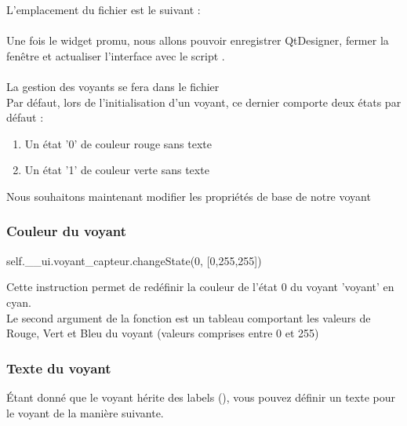 

L'emplacement du fichier  est le suivant : \\

 \\


Une fois le widget promu, nous allons pouvoir enregistrer QtDesigner, fermer la fenêtre et actualiser l'interface avec le script .\\ \\

La gestion des voyants se fera dans le fichier  \\


Par défaut, lors de l'initialisation d'un voyant, ce dernier comporte deux états par défaut : 


\begin{enumerate}
    \item Un état '0' de couleur rouge sans texte
    \item Un état '1' de couleur verte sans texte
\end{enumerate}

Nous souhaitons maintenant modifier les propriétés de base de notre voyant

\subsubsection{Couleur du voyant}

\begin{pyCode}
self.__ui.voyant_capteur.changeState(0, [0,255,255]) 
\end{pyCode}
Cette instruction permet de redéfinir la couleur de l'état 0 du voyant 'voyant\capteur' en cyan. \\
Le second argument de la fonction  est un tableau comportant les valeurs de Rouge, Vert et Bleu du voyant (valeurs comprises entre 0 et 255) \\

\subsubsection{Texte du voyant}

Étant donné que le voyant hérite des labels (), vous pouvez définir un texte pour le voyant de la manière suivante.


